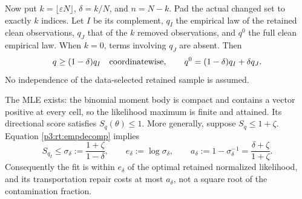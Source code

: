 \documentclass[11pt,a4paper]{article}
\theoremstyle{definition}
\theoremstyle{remark}
\numberwithin{equation}{section}
\begin{document}
Now put $k=\lfloor\varepsilon N\rfloor$, $\delta=k/N$, and $n=N-k$.
Pad the actual changed set to exactly $k$ indices.  Let $I$ be its
complement, $q_I$ the empirical law of the retained clean observations,
$q_J$ that of the $k$ removed observations, and $q^0$ the full clean
empirical law.  When $k=0$, terms involving $q_J$ are absent.  Then
\begin{equation}\label{p3:rt:empdecomp}
 q\ge(1-\delta)q_I\quad\hbox{coordinatewise},\qquad
 q^0=(1-\delta)q_I+\delta q_J.
\end{equation}
No independence of the data-selected retained sample is assumed.

The MLE exists: the binomial moment body is compact and contains a
vector positive at every cell, so the likelihood maximum is finite
and attained.  Its directional score satisfies $S_q(\theta)\le1$.
More generally, suppose $S_q\le1+\zeta$.  Equation \eqref{p3:rt:empdecomp}
implies
\begin{equation}\label{p3:rt:retainedscore}
 S_{q_I}\le\sigma_\delta:=\frac{1+\zeta}{1-\delta},\qquad
 e_\delta:=\log\sigma_\delta,\qquad
 a_\delta:=1-\sigma_\delta^{-1}
                    =\frac{\delta+\zeta}{1+\zeta}.
\end{equation}
Consequently the fit is within $e_\delta$ of the optimal retained
normalized likelihood, and its transportation repair costs at most
$a_\delta$, not a square root of the contamination fraction.
\end{document}
